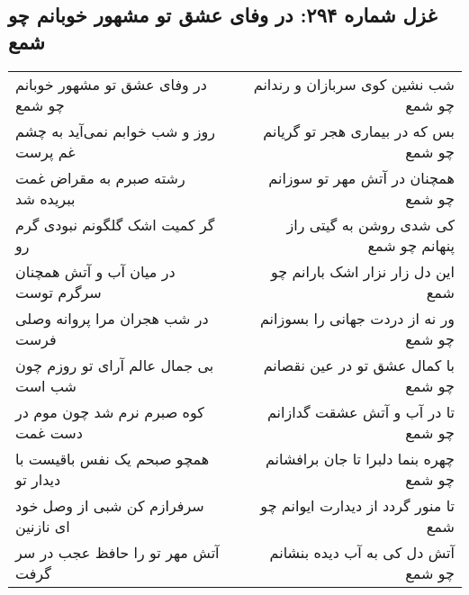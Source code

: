 \begin{center}
\section*{غزل شماره ۲۹۴: در وفای عشق تو مشهور خوبانم چو شمع}
\label{sec:sh294}
\begin{longtable}{l p{0.5cm} r}
در وفای عشق تو مشهور خوبانم چو شمع
&&
شب نشین کوی سربازان و رندانم چو شمع
\\
روز و شب خوابم نمی‌آید به چشم غم پرست
&&
بس که در بیماری هجر تو گریانم چو شمع
\\
رشته صبرم به مقراض غمت ببریده شد
&&
همچنان در آتش مهر تو سوزانم چو شمع
\\
گر کمیت اشک گلگونم نبودی گرم رو
&&
کی شدی روشن به گیتی راز پنهانم چو شمع
\\
در میان آب و آتش همچنان سرگرم توست
&&
این دل زار نزار اشک بارانم چو شمع
\\
در شب هجران مرا پروانه وصلی فرست
&&
ور نه از دردت جهانی را بسوزانم چو شمع
\\
بی جمال عالم آرای تو روزم چون شب است
&&
با کمال عشق تو در عین نقصانم چو شمع
\\
کوه صبرم نرم شد چون موم در دست غمت
&&
تا در آب و آتش عشقت گدازانم چو شمع
\\
همچو صبحم یک نفس باقیست با دیدار تو
&&
چهره بنما دلبرا تا جان برافشانم چو شمع
\\
سرفرازم کن شبی از وصل خود ای نازنین
&&
تا منور گردد از دیدارت ایوانم چو شمع
\\
آتش مهر تو را حافظ عجب در سر گرفت
&&
آتش دل کی به آب دیده بنشانم چو شمع
\\
\end{longtable}
\end{center}
